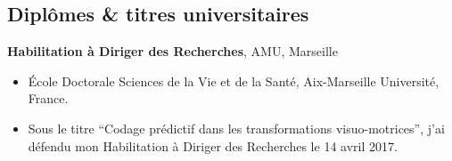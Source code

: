 \documentclass[10pt,french,a4paper,twoside]{article}%
\newcommand{\years}[1]{\marginpar{\textit{\scriptsize #1}}}
\begin{document}
\subsection{Diplômes \& titres universitaires}

\textbf{Habilitation à Diriger des Recherches}, AMU, Marseille\hfill \years{\textbf{2017}}\\
\vspace*{-.15in}
\begin{itemize}
\item[] \'Ecole Doctorale Sciences de la Vie et de la Santé, Aix-Marseille Université, France.
\item[] Sous le titre ``Codage prédictif dans les transformations visuo-motrices'', j'ai défendu mon Habilitation à Diriger des Recherches le 14 avril 2017.
\end{itemize} %
\end{document}
